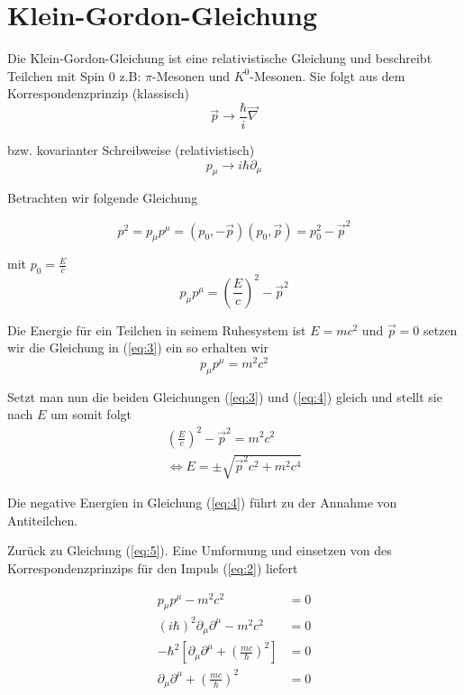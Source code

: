 
 



\section*{Klein-Gordon-Gleichung}


Die Klein-Gordon-Gleichung ist eine relativistische Gleichung und beschreibt Teilchen mit Spin 0 z.B: \(\pi\)-Mesonen und \(K^0\)-Mesonen. Sie folgt aus dem Korrespondenzprinzip (klassisch)
\begin{equation}
  \label{eq:1}
  \vec p \rightarrow \frac{\hbar}{i}\vec\nabla 
\end{equation}

bzw. kovarianter Schreibweise (relativistisch)
\begin{equation}
  \label{eq:2}
  p_\mu \rightarrow i\hbar \partial_\mu
\end{equation}

Betrachten wir folgende Gleichung

\[p^2 = p_\mu p^\mu = (p_0,-\vec p) (p_0,\vec p) =  p_0^2 -\vec p^2\]

mit \(p_0 = \frac{E}{c}\) 
\begin{equation}
  \label{eq:3}
  p_\mu p^\mu =  \left( \frac{E}{c}\right)^2 -\vec p^2
\end{equation}


Die Energie für ein Teilchen in seinem Ruhesystem ist \(E=mc^2\) und \(\vec p = 0\) setzen wir die Gleichung in (\ref{eq:3}) ein so erhalten wir
\begin{equation}
  \label{eq:5}
   p_\mu p^\mu = m^2c^2
\end{equation}

Setzt man nun die beiden Gleichungen (\ref{eq:3}) und (\ref{eq:4}) gleich und stellt sie nach \(E\) um somit folgt
\begin{align}
  \label{eq:4}
  \left( \frac{E}{c}\right)^2 -\vec p^2  = m^2c^2 \\
\Leftrightarrow E = \pm \sqrt{\vec p^2c^2 + m^2c^4}
\end{align}

Die negative Energien in Gleichung (\ref{eq:4}) führt zu der Annahme von Antiteilchen.

Zurück zu Gleichung (\ref{eq:5}). Eine Umformung und einsetzen von des Korrespondenzprinzips für den Impuls (\ref{eq:2}) liefert

\begin{align}
  \label{eq:6}
   p_\mu p^\mu - m^2c^2 &= 0 \\
(i\hbar)^2\partial_\mu\partial^\mu -  m^2c^2 &= 0 \\
-\hbar^2\left[\partial_\mu\partial^\mu + \left(\frac{mc}{\hbar}\right)^2  \right] &= 0 \\
\partial_\mu\partial^\mu + \left(\frac{mc}{\hbar}\right)^2  &= 0
\end{align}


